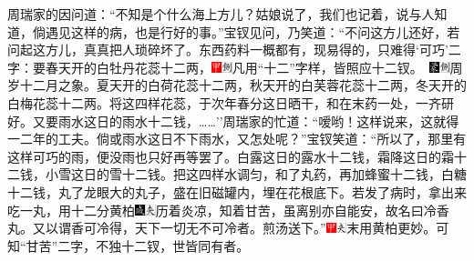 周瑞家的因问道：``不知是个什么海上方儿？姑娘说了，我们也记着，说与人知道，倘遇见这样的病，也是行好的事。''宝钗见问，乃笑道：``不问这方儿还好，若问起这方儿，真真把人琐碎坏了。东西药料一概都有，现易得的，只难得`可巧'二字：要春天开的白牡丹花蕊十二两，{{\includegraphics[width=3mm]{../Images/00002}\includegraphics[width=3mm]{../Images/00011}\footnotesize \kaishu 凡用``十二''字样，皆照应十二钗。　}\includegraphics[width=3mm]{../Images/00006}\includegraphics[width=3mm]{../Images/00011}\footnotesize \kaishu 周岁十二月之象。}夏天开的白荷花蕊十二两，秋天开的白芙蓉花蕊十二两，冬天开的白梅花蕊十二两。将这四样花蕊，于次年春分这日晒干，和在末药一处，一齐研好。又要雨水这日的雨水十二钱，\ldots{}\ldots{}''周瑞家的忙道：``嗳哟！这样说来，这就得一二年的工夫。倘或雨水这日不下雨水，又怎处呢？''宝钗笑道：``所以了，那里有这样可巧的雨，便没雨也只好再等罢了。白露这日的露水十二钱，霜降这日的霜十二钱，小雪这日的雪十二钱。把这四样水调匀，和了丸药，再加蜂蜜十二钱，白糖十二钱，丸了龙眼大的丸子，盛在旧磁罐内，埋在花根底下。若发了病时，拿出来吃一丸，用十二分黄柏{\includegraphics[width=3mm]{../Images/00005}\includegraphics[width=3mm]{../Images/00012}\footnotesize \kaishu 历着炎凉，知着甘苦，虽离别亦自能安，故名曰冷香丸。又以谓香可冷得，天下一切无不可冷者。}煎汤送下。''{\includegraphics[width=3mm]{../Images/00002}\includegraphics[width=3mm]{../Images/00012}\footnotesize \kaishu 末用黄柏更妙。可知``甘苦''二字，不独十二钗，世皆同有者。}

